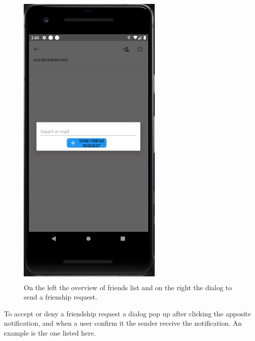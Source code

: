 \documentclass[../../main]{subfiles}
\begin{document}
\begin{figure}[H]
    \includegraphics[width=70mm,height=150mm]{images/app/friend/send_request.png}
    \caption{On the left the overview of friends list and on the right the dialog to send a frienship request.}
\end{figure}

To accept or deny a friendship request a dialog pop up after clicking the apposite notification, and when a user confirm it the sender receive the notification.
An example is the one listed here.
\end{document}
